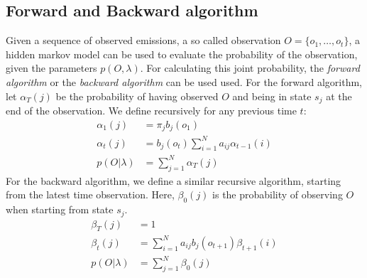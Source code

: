 \begin{minipage}{\linewidth}
	\label{fig:hmm}
	\hspace{1cm}
\end{minipage}

\subsection{Forward and Backward algorithm}
Given a sequence of observed emissions, a so called observation $O = \{o_1, \dots, o_t\}$, a hidden markov model can be used to evaluate the probability of the observation, given the parameters $p(O, \lambda)$. For calculating this joint probability, the \textit{forward algorithm} or the \textit{backward algorithm} can be used used. For the forward algorithm, let $\alpha_T(j)$ be the probability of having observed $O$ and being in state $s_j$ at the end of the observation. We define recursively for any previous time $t$:
\begin{align*}
\alpha_1(j) &= \pi_j b_j(o_1) \\
\alpha_t(j) &= b_j(o_t) \sum_{i = 1}^{N} a_{ij}\alpha_{t-1}(i) \\
p(O|\lambda) &= \sum_{j = 1}^{N} \alpha_T(j)
\end{align*}
For the backward algorithm, we define a similar recursive algorithm, starting from the latest time observation. Here, $\beta_0(j)$ is the probability of observing $O$ when starting from state $s_j$.
\begin{align*}
\beta_T(j) &= 1 \\
\beta_t(j) &= \sum_{i = 1}^{N} a_{ij}b_j(o_{t+1}) \beta_{t+1}(i) \\
p(O|\lambda) &= \sum_{j = 1}^{N} \beta_0(j)
\end{align*}
